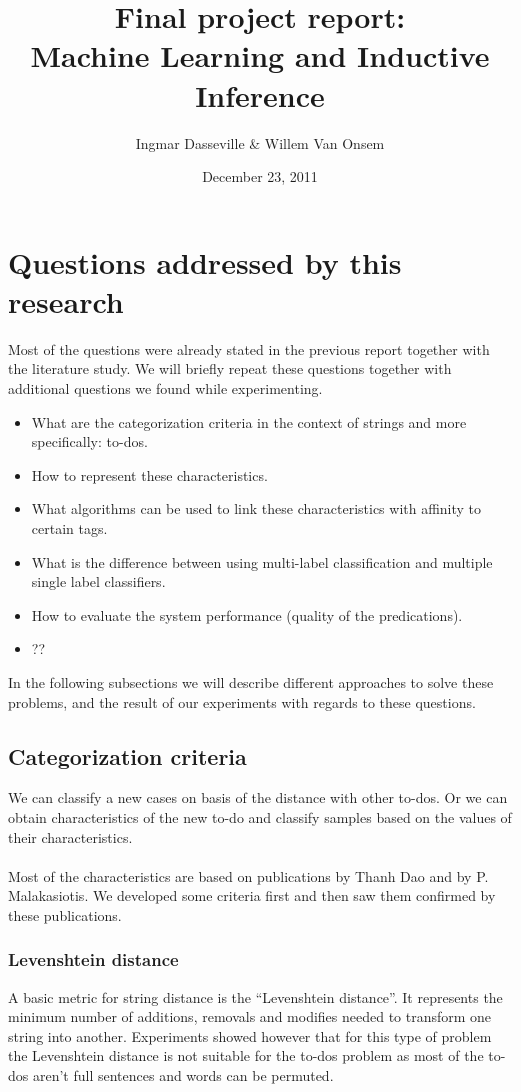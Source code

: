 \documentclass[a4paper,titlepage]{article}
\title{Final project report:\\Machine Learning and Inductive Inference}
\author{Ingmar Dasseville \& Willem Van Onsem}
\date{December 23, 2011}
\begin{document}
\begin{titlepage}
\maketitle
\end{titlepage}
\tableofcontents
\newpage
\section{Questions addressed by this research}
Most of the questions were already stated in the previous report together with the literature study. We will briefly repeat these questions together with additional questions we found while experimenting.
\begin{itemize}
 \item What are the categorization criteria in the context of strings and more specifically: to-dos.
 \item How to represent these characteristics.
 \item What algorithms can be used to link these characteristics with affinity to certain tags.
 \item What is the difference between using multi-label classification and multiple single label classifiers.
 \item How to evaluate the system performance (quality of the predications).
 \item ??
\end{itemize}
In the following subsections we will describe different approaches to solve these problems, and the result of our experiments with regards to these questions.
\subsection{Categorization criteria}
We can classify a new cases on basis of the distance with other to-dos. Or we can obtain characteristics of the new to-do and classify samples based on the values of their characteristics.
\paragraph{}
Most of the characteristics are based on publications \cite{codeproject2,codeproject1} by Thanh Dao and \cite{Malakasiotis:2007:LTE:1654536.1654547} by P. Malakasiotis. We developed some criteria first and then saw them confirmed by these publications.
\subsubsection{Levenshtein distance}
A basic metric for string distance is the ``Levenshtein distance''. It represents the minimum number of additions, removals and modifies needed to transform one string into another. Experiments showed however that for this type of problem the Levenshtein distance is not suitable for the to-dos problem as most of the to-dos aren't full sentences and words can be permuted.
\end{document}
